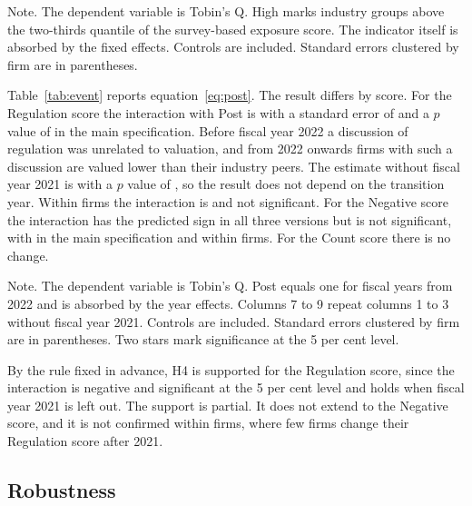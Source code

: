 \documentclass[12pt,a4paper]{article}
\newcommand{\tablenote}[1]{\par\smallskip\begin{minipage}{\linewidth}\footnotesize\setstretch{1.05}#1\end{minipage}}
\newcommand{\widetable}[1]{\resizebox{\ifdim\width>\linewidth\linewidth\else\width\fi}{!}{}}
\begin{document}
\begin{table}[!htbp]
\centering\small
\caption{Biodiversity scores and Tobin's Q in high-exposure industries}\label{tab:exposure}
\widetable{tables/tab_exposure}
\tablenote{Note. The dependent variable is Tobin's Q. High marks industry groups above the two-thirds quantile of the survey-based exposure score. The indicator itself is absorbed by the fixed effects. Controls are included. Standard errors clustered by firm are in parentheses.}
\end{table}

Table~\ref{tab:event} reports equation~\eqref{eq:post}. The result differs by score. For the Regulation score the interaction with Post is \coefEReg{} with a standard error of \seEReg{} and a $p$ value of \pvalEReg{} in the main specification. Before fiscal year 2022 a discussion of regulation was unrelated to valuation, and from 2022 onwards firms with such a discussion are valued lower than their industry peers. The estimate without fiscal year 2021 is \coefEDReg{} with a $p$ value of \pvalEDReg{}, so the result does not depend on the transition year. Within firms the interaction is \coefEFReg{} and not significant. For the Negative score the interaction has the predicted sign in all three versions but is not significant, with \coefENeg{} in the main specification and \coefEFNeg{} within firms. For the Count score there is no change.

\begin{table}[!htbp]
\centering\footnotesize
\caption{Biodiversity scores and Tobin's Q after the Kunming Declaration}\label{tab:event}
\widetable{tables/tab_event}
\tablenote{Note. The dependent variable is Tobin's Q. Post equals one for fiscal years from 2022 and is absorbed by the year effects. Columns 7 to 9 repeat columns 1 to 3 without fiscal year 2021. Controls are included. Standard errors clustered by firm are in parentheses. Two stars mark significance at the 5 per cent level.}
\end{table}

By the rule fixed in advance, H4 is supported for the Regulation score, since the interaction is negative and significant at the 5 per cent level and holds when fiscal year 2021 is left out. The support is partial. It does not extend to the Negative score, and it is not confirmed within firms, where few firms change their Regulation score after 2021.

\subsection{Robustness}
\end{document}
